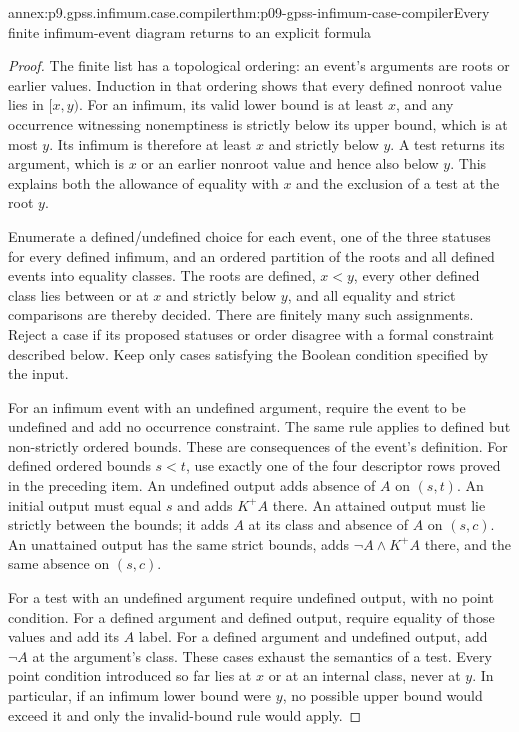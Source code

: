 \begin{annexitem}{annex:p9.gpss.infimum.case.compiler}{thm:p09-gpss-infimum-case-compiler}{Every finite infimum-event diagram returns to an explicit formula}
\begin{proof}
The finite list has a topological ordering: an event's arguments
are roots or earlier values. Induction in that ordering shows
that every defined nonroot value lies in \([x,y)\).
For an infimum, its valid lower bound is at least \(x\),
and any occurrence witnessing nonemptiness is strictly below
its upper bound, which is at most \(y\). Its infimum is
therefore at least \(x\) and strictly below \(y\).
A test returns its argument, which is \(x\) or an earlier
nonroot value and hence also below \(y\). This explains
both the allowance of equality with \(x\) and the exclusion
of a test at the root \(y\).

Enumerate a defined/undefined choice for each event, one of
the three statuses for every defined infimum, and an ordered
partition of the roots and all defined events into equality
classes. The roots are defined, \(x<y\), every other
defined class lies between or at \(x\) and strictly below
\(y\), and all equality and strict comparisons are thereby
decided. There are finitely many such assignments. Reject
a case if its proposed statuses or order disagree with a
formal constraint described below. Keep only cases satisfying
the Boolean condition specified by the input.

For an infimum event with an undefined argument, require
the event to be undefined and add no occurrence constraint.
The same rule applies to defined but non-strictly ordered
bounds. These are consequences of the event's definition.
For defined ordered bounds \(s<t\), use exactly one
of the four descriptor rows proved in the preceding item.
An undefined output adds absence of \(A\) on \((s,t)\).
An initial output must equal \(s\) and adds \(K^+A\)
there. An attained output must lie strictly between the
bounds; it adds \(A\) at its class and absence of \(A\)
on \((s,c)\). An unattained output has the same strict
bounds, adds \(\neg A\land K^+A\) there, and the
same absence on \((s,c)\).

For a test with an undefined argument require undefined
output, with no point condition. For a defined argument
and defined output, require equality of those values and
add its \(A\) label. For a defined argument and undefined
output, add \(\neg A\) at the argument's class.
These cases exhaust the semantics of a test. Every point
condition introduced so far lies at \(x\) or at an
internal class, never at \(y\). In particular, if an
infimum lower bound were \(y\), no possible upper bound
would exceed it and only the invalid-bound rule would apply.


\end{proof}
\end{annexitem}
